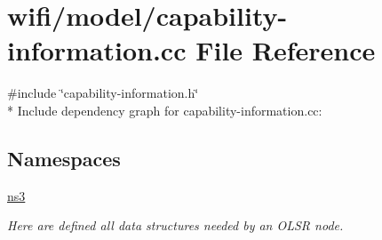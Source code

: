 \hypertarget{capability-information_8cc}{}\section{wifi/model/capability-\/information.cc File Reference}
\label{capability-information_8cc}
{\ttfamily \#include \char`\"{}capability-\/information.\+h\char`\"{}}\\*
Include dependency graph for capability-\/information.cc\+:
\subsection*{Namespaces}
\begin{DoxyCompactItemize}
\item 
 \hyperlink{namespacens3}{ns3}
\begin{DoxyCompactList}\small\item\em Here are defined all data structures needed by an O\+L\+SR node. \end{DoxyCompactList}\end{DoxyCompactItemize}
